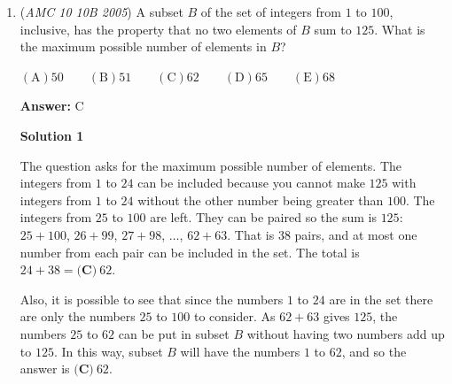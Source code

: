 \begin{enumerate}
 



\textbf{Solution 5}

Playing around with two-digit numbers that are reverses of each other, we quickly realize they always differ by a multiple of 9 and always sum to a multiple of 11. We simplify the given expression into a difference of squares:

 
 \[(x+y)(x-y)=m^2\]

 We then take the square root of the left side of the equation

 
 \[\sqrt{(x+y)(x-y)}\]

 and notice that $(x-y)$ will always be a multiple of $9$, as we said before, which will come out of the radical right away if we assume that it is just $9$. We know that $(x+y)$ will always have a factor of $11$, so to break this part out of the radical and create an integer solution for $m$, we need another factor of 11 to make $(x+y)$ equal to 121. We simplify the equation and see that $m$ is 33. To solve for $x$ and $y$ we solve the system of $(x+y)=121$ and $(x-y)=9$ to find that $x=65$ and $y=56$. We sum the three values together and see that the answer is $\boxed{\textbf{(E) }154}$.

 


	\item (\textit{AMC 10 10B 2005}) A subset $B$ of the set of integers from $1$ to $100$, inclusive, has the property that no two elements of $B$ sum to $125$. What is the maximum possible number of elements in $B$?


 $\mathrm{(A)} 50 \qquad \mathrm{(B)} 51 \qquad \mathrm{(C)} 62 \qquad \mathrm{(D)} 65 \qquad \mathrm{(E)} 68$

 \textbf{Answer: }C



\textbf{Solution 1}

The question asks for the maximum possible number of elements. The integers from $1$ to $24$ can be included because you cannot make $125$ with integers from $1$ to $24$ without the other number being greater than $100$. The integers from $25$ to $100$ are left. They can be paired so the sum is $125$: $25+100$, $26+99$, $27+98$, $\ldots$, $62+63$. That is $38$ pairs, and at most one number from each pair can be included in the set. The total is $24 + 38 = \boxed{\textbf{(C)}\ 62}$.

 Also, it is possible to see that since the numbers $1$ to $24$ are in the set there are only the numbers $25$ to $100$ to consider. As $62+63$ gives $125$, the numbers $25$ to $62$ can be put in subset $B$ without having two numbers add up to $125$. In this way, subset $B$ will have the numbers $1$ to $62$, and so the answer is $\boxed{\textbf{(C)}\ 62}$.


\end{enumerate}
